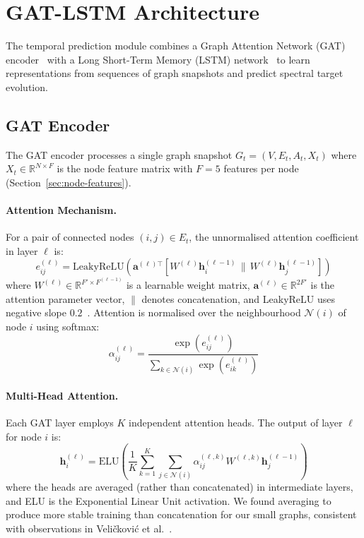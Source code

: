 \section{GAT-LSTM Architecture}
\label{sec:gat-architecture}

The temporal prediction module combines a Graph Attention Network (GAT) encoder~\cite{velickovic2018graph} with a Long Short-Term Memory (LSTM) network~\cite{hochreiter1997long} to learn representations from sequences of graph snapshots and predict spectral target evolution.

\subsection{GAT Encoder}

The GAT encoder processes a single graph snapshot $G_t = (V, E_t, A_t, X_t)$ where $X_t \in \mathbb{R}^{N \times F}$ is the node feature matrix with $F = 5$ features per node (Section~\ref{sec:node-features}).

\paragraph{Attention Mechanism.}
For a pair of connected nodes $(i, j) \in E_t$, the unnormalised attention coefficient in layer $\ell$ is:
\begin{equation}
    e_{ij}^{(\ell)} = \mathrm{LeakyReLU}\!\left(\mathbf{a}^{(\ell)\top}\left[W^{(\ell)}\mathbf{h}_i^{(\ell-1)} \,\|\, W^{(\ell)}\mathbf{h}_j^{(\ell-1)}\right]\right)
    \label{eq:gat-attention}
\end{equation}
where $W^{(\ell)} \in \mathbb{R}^{F' \times F^{(\ell-1)}}$ is a learnable weight matrix, $\mathbf{a}^{(\ell)} \in \mathbb{R}^{2F'}$ is the attention parameter vector, $\|$ denotes concatenation, and LeakyReLU uses negative slope $0.2$~\cite{velickovic2018graph}. Attention is normalised over the neighbourhood $\mathcal{N}(i)$ of node $i$ using softmax:
\begin{equation}
    \alpha_{ij}^{(\ell)} = \frac{\exp(e_{ij}^{(\ell)})}{\sum_{k \in \mathcal{N}(i)} \exp(e_{ik}^{(\ell)})}
    \label{eq:gat-softmax}
\end{equation}

\paragraph{Multi-Head Attention.}
Each GAT layer employs $K$ independent attention heads. The output of layer $\ell$ for node $i$ is:
\begin{equation}
    \mathbf{h}_i^{(\ell)} = \text{ELU}\!\left(\frac{1}{K}\sum_{k=1}^{K}\sum_{j \in \mathcal{N}(i)} \alpha_{ij}^{(\ell,k)} W^{(\ell,k)} \mathbf{h}_j^{(\ell-1)}\right)
    \label{eq:gat-multihead}
\end{equation}
where the heads are averaged (rather than concatenated) in intermediate layers, and ELU is the Exponential Linear Unit activation. We found averaging to produce more stable training than concatenation for our small graphs, consistent with observations in Veli\v{c}kovi\'{c} et al.~\cite{velickovic2018graph}.

